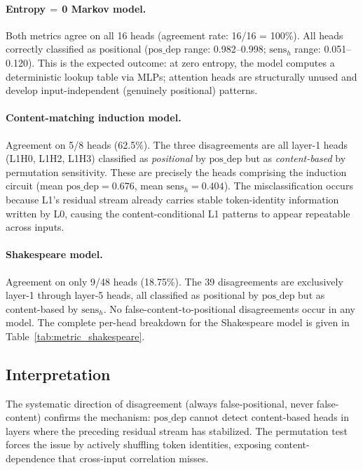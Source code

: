 \paragraph{Entropy\,$=$\,0 Markov model.} Both metrics agree on all 16 heads
(agreement rate: 16/16 = 100\%). All heads correctly classified as positional
($\text{pos\_dep}$ range: 0.982--0.998; $\text{sens}_h$ range: 0.051--0.120).
This is the expected outcome: at zero entropy, the model computes a deterministic
lookup table via MLPs; attention heads are structurally unused and develop
input-independent (genuinely positional) patterns.

\paragraph{Content-matching induction model.} Agreement on 5/8 heads (62.5\%).
The three disagreements are all layer-1 heads (L1H0, L1H2, L1H3) classified as
\emph{positional} by $\text{pos\_dep}$ but as \emph{content-based} by permutation
sensitivity. These are precisely the heads comprising the induction circuit (mean
$\text{pos\_dep} = 0.676$, mean $\text{sens}_h = 0.404$). The misclassification
occurs because L1's residual stream already carries stable token-identity information
written by L0, causing the content-conditional L1 patterns to appear repeatable across
inputs.

\paragraph{Shakespeare model.} Agreement on only 9/48 heads (18.75\%).
The 39 disagreements are exclusively layer-1 through layer-5 heads, all classified as
positional by $\text{pos\_dep}$ but as content-based by $\text{sens}_h$. No
false-content-to-positional disagreements occur in any model. The complete per-head
breakdown for the Shakespeare model is given in Table~\ref{tab:metric_shakespeare}.

\subsection{Interpretation}

The systematic direction of disagreement (always false-positional, never false-content)
confirms the mechanism: $\text{pos\_dep}$ cannot detect content-based heads in layers
where the preceding residual stream has stabilized. The permutation test forces the issue
by actively shuffling token identities, exposing content-dependence that cross-input
correlation misses.

